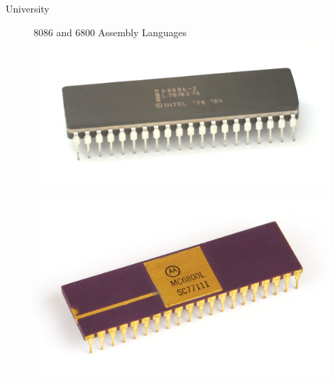 \documentclass{beamer}
\begin{document}
  \begin{frame}{University}
    \begin{figure}
      8086 and 6800 Assembly Languages
      \includegraphics[scale=0.1]{images/8086}
      \includegraphics[scale=0.5]{images/6800}
    \end{figure}
    \begin{figure}

\end{figure}
\end{frame}
\end{document}
